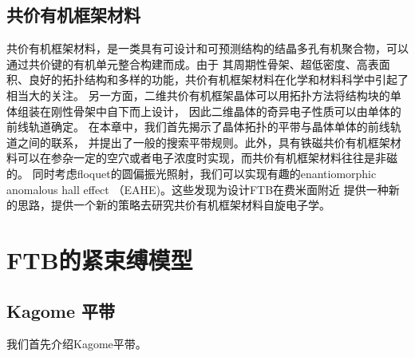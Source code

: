 \subsection{共价有机框架材料}
共价有机框架材料，是一类具有可设计和可预测结构的结晶多孔有机聚合物，可以通过共价键的有机单元整合构建而成。由于
其周期性骨架、超低密度、高表面积、良好的拓扑结构和多样的功能，共价有机框架材料在化学和材料科学中引起了相当大的关注。
另一方面，二维共价有机框架晶体可以用拓扑方法将结构块的单体组装在刚性骨架中自下而上设计，
因此二维晶体的奇异电子性质可以由单体的前线轨道确定。 在本章中，我们首先揭示了晶体拓扑的平带与晶体单体的前线轨道之间的联系，
并提出了一般的搜索平带规则。此外，具有铁磁共价有机框架材料可以在参杂一定的空穴或者电子浓度时实现，而共价有机框架材料往往是非磁的。
同时考虑floquet的圆偏振光照射，我们可以实现有趣的enantiomorphic anomalous hall effect （EAHE)。这些发现为设计FTB在费米面附近
提供一种新的思路，提供一个新的策略去研究共价有机框架材料自旋电子学。




\section{FTB的紧束缚模型}

\subsection{Kagome 平带}
我们首先介绍Kagome平带。